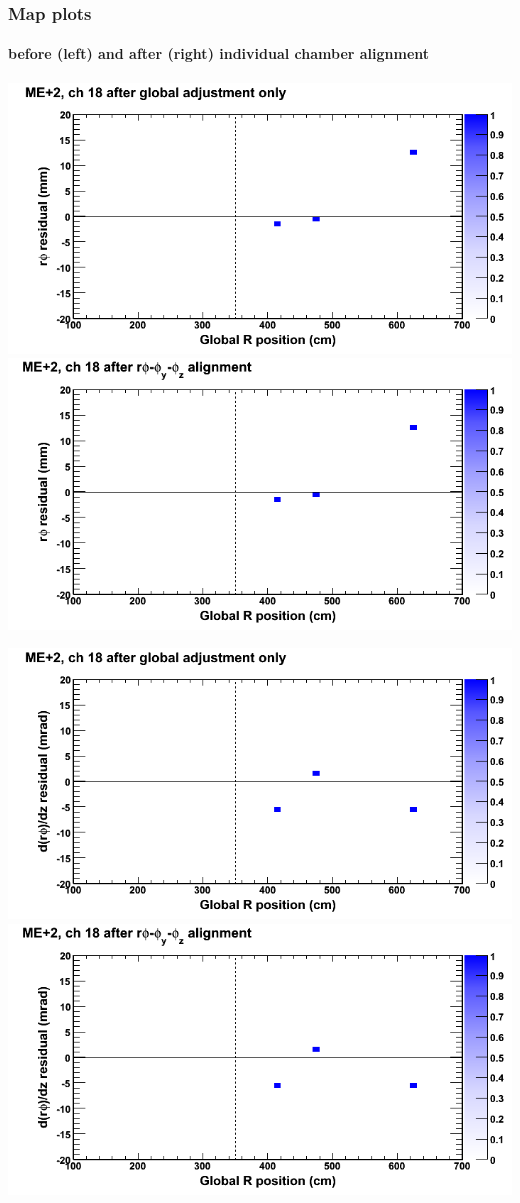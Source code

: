 \documentclass[compress]{beamer}
\begin{document}
\begin{frame}
\frametitle{Map plots}
\framesubtitle{before (left) and after (right) individual chamber alignment}
\includegraphics[width=0.5\linewidth]{ringmapplots_3dof/before_CSCvsr_mep2ch18_x.png} \includegraphics[width=0.5\linewidth]{ringmapplots_3dof/after_CSCvsr_mep2ch18_x.png}

\includegraphics[width=0.5\linewidth]{ringmapplots_3dof/before_CSCvsr_mep2ch18_dxdz.png} \includegraphics[width=0.5\linewidth]{ringmapplots_3dof/after_CSCvsr_mep2ch18_dxdz.png}
\end{frame}
\end{document}
